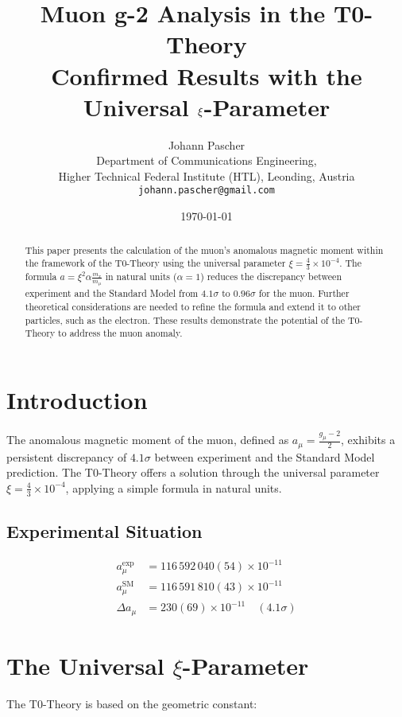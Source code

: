 \documentclass[12pt,a4paper]{article}
\title{Muon g-2 Analysis in the T0-Theory \\
	Confirmed Results with the Universal $\xipar$-Parameter}
\author{Johann Pascher\\
	Department of Communications Engineering, \\Higher Technical Federal Institute (HTL), Leonding, Austria\\
	\texttt{johann.pascher@gmail.com}}
\date{\today}
\newcommand{\xipar}{\xi}
\begin{document}
	
	\maketitle
	
	\begin{abstract}
		This paper presents the calculation of the muon's anomalous magnetic moment within the framework of the T0-Theory using the universal parameter \(\xipar = \frac{4}{3} \times 10^{-4}\). The formula \(a = \xipar^2 \alpha \frac{m_x}{m_\mu}\) in natural units (\(\alpha = 1\)) reduces the discrepancy between experiment and the Standard Model from \(4.1\sigma\) to \(0.96\sigma\) for the muon. Further theoretical considerations are needed to refine the formula and extend it to other particles, such as the electron. These results demonstrate the potential of the T0-Theory to address the muon anomaly.
	\end{abstract}
	
	\tableofcontents
	\newpage
	
	\section{Introduction}
	
	The anomalous magnetic moment of the muon, defined as \(a_\mu = \frac{g_\mu - 2}{2}\), exhibits a persistent discrepancy of \(4.1\sigma\) between experiment and the Standard Model prediction. The T0-Theory offers a solution through the universal parameter \(\xipar = \frac{4}{3} \times 10^{-4}\), applying a simple formula in natural units.
	
	\subsection{Experimental Situation}
	
	\begin{align}
		a_\mu^{\text{exp}} &= 116\,592\,040(54) \times 10^{-11} \\
		a_\mu^{\text{SM}} &= 116\,591\,810(43) \times 10^{-11} \\
		\Delta a_\mu &= 230(69) \times 10^{-11} \quad (4.1\sigma)
	\end{align}
	
	\section{The Universal $\xipar$-Parameter}
	
	The T0-Theory is based on the geometric constant:
	
\end{document}
